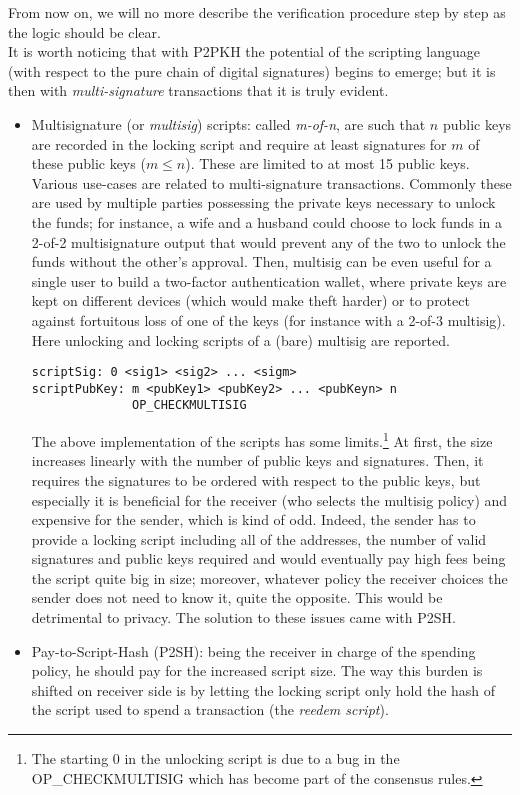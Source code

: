 \noindent
From now on, we will no more describe the verification procedure step by step as the logic should be clear.\\
It is worth noticing that with P2PKH the potential of the scripting language (with respect to the pure chain of digital signatures) begins to emerge; but it is then with \textit{multi-signature} transactions that it is truly evident.
\begin{itemize}[leftmargin=*]
\item Multisignature (or \textit{multisig}) scripts: called \textit{m-of-n}, are such that $n$ public keys are recorded in the locking script and require at least signatures for $m$ of these public keys ($m \leq n$). These are limited to at most 15 public keys. Various use-cases are related to multi-signature transactions. Commonly these are used by multiple parties possessing the private keys necessary to unlock the funds; for instance, a wife and a husband could choose to lock funds in a 2-of-2 multisignature output that would prevent any of the two to unlock the funds without the other's approval. Then, multisig can be even useful for a single user to build a two-factor authentication wallet, where private keys are kept on different devices (which would make theft harder) or to protect against fortuitous loss of one of the keys (for instance with a 2-of-3 multisig). Here unlocking and locking scripts of a (bare) multisig are reported.
\begin{lstlisting}[frame=single]
scriptSig: 0 <sig1> <sig2> ... <sigm>
scriptPubKey: m <pubKey1> <pubKey2> ... <pubKeyn> n
              OP_CHECKMULTISIG
\end{lstlisting}
The above implementation of the scripts has some limits.\footnote{The starting 0 in the unlocking script is due to a bug in the OP\_CHECKMULTISIG which has become part of the consensus rules.}
At first, the size increases linearly with the number of public keys and signatures. Then, it requires the signatures to be ordered with respect to the public keys, but especially it is beneficial for the receiver (who selects the multisig policy) and expensive for the sender, which is kind of odd. Indeed, the sender has to provide a locking script including all of the addresses, the number of valid signatures and public keys required and would eventually pay high fees being the script quite big in size; moreover, whatever policy the receiver choices the sender does not need to know it, quite the opposite. This would be detrimental to privacy. The solution to these issues came with P2SH.
\item Pay-to-Script-Hash (P2SH): being the receiver in charge of the spending policy, he should pay for the increased script size. The way this burden is shifted on receiver side is by letting the locking script only hold the hash of the script used to spend a transaction (the \textit{reedem script}).

\end{itemize}
